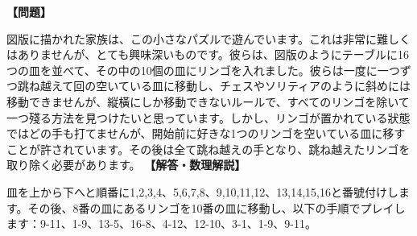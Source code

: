 \documentclass[10pt,a4paper,oneside,openany]{ltjsbook}
\begin{document}
\begin{tcolorbox}[colback=softblue,colframe=primaryblue,title=\textbf{第 228 問：十個のリンゴ （原題: THE TEN APPLES.）},arc=2mm,boxrule=1pt,breakable]
\textbf{【問題】}\par\vspace{0.3em}
図版に描かれた家族は、この小さなパズルで遊んでいます。これは非常に難しくはありませんが、とても興味深いものです。彼らは、図版のようにテーブルに16つの皿を並べて、その中の10個の皿にリンゴを入れました。彼らは一度に一つずつ跳ね越えて回の空いている皿に移動し、チェスやソリティアのように斜めには移動できませんが、縦橫にしか移動できないルールで、すべてのリンゴを除いて一つ殘る方法を見つけたいと思っています。しかし、リンゴが置かれている狀態ではどの手も打てませんが、開始前に好きな1つのリンゴを空いている皿に移すことが許されています。その後は全て跳ね越えの手となり、跳ね越えたリンゴを取り除く必要があります。
\tcblower
\textbf{【解答・数理解説】}\par\vspace{0.3em}
皿を上から下へと順番に1,2,3,4、5,6,7,8、9,10,11,12、13,14,15,16と番號付けします。その後、8番の皿にあるリンゴを10番の皿に移動し、以下の手順でプレイします：9-11、1-9、13-5、16-8、4-12、12-10、3-1、1-9、9-11。
\end{tcolorbox}
\end{document}
